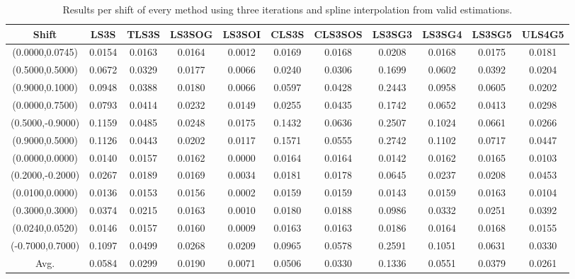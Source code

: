 \begin{table}[ht!]
\centering
\begin{tabular}{c|c|c|c|c|c|c|c|c|c|c}
Shift & \scriptsize{LS3S} & \scriptsize{TLS3S} & \scriptsize{LS3SOG} & \scriptsize{LS3SOI} & \scriptsize{CLS3S} & \scriptsize{CLS3SOS} & \scriptsize{LS3SG3} & \scriptsize{LS3SG4} & \scriptsize{LS3SG5} & \scriptsize{ULS4G5}\\ \hline 
(0.0000,0.0745) & 0.0154 & 0.0163 & 0.0164 & 0.0012 & 0.0169 & 0.0168 & 0.0208 & 0.0168 & 0.0175 & 0.0181 \\ \hline
(0.5000,0.5000) & 0.0672 & 0.0329 & 0.0177 & 0.0066 & 0.0240 & 0.0306 & 0.1699 & 0.0602 & 0.0392 & 0.0204 \\ \hline
(0.9000,0.1000) & 0.0948 & 0.0388 & 0.0180 & 0.0066 & 0.0597 & 0.0428 & 0.2443 & 0.0958 & 0.0605 & 0.0202 \\ \hline
(0.0000,0.7500) & 0.0793 & 0.0414 & 0.0232 & 0.0149 & 0.0255 & 0.0435 & 0.1742 & 0.0652 & 0.0413 & 0.0298 \\ \hline
(0.5000,-0.9000) & 0.1159 & 0.0485 & 0.0248 & 0.0175 & 0.1432 & 0.0636 & 0.2507 & 0.1024 & 0.0661 & 0.0266 \\ \hline
(0.9000,0.5000) & 0.1126 & 0.0443 & 0.0202 & 0.0117 & 0.1571 & 0.0555 & 0.2742 & 0.1102 & 0.0717 & 0.0447 \\ \hline
(0.0000,0.0000) & 0.0140 & 0.0157 & 0.0162 & 0.0000 & 0.0164 & 0.0164 & 0.0142 & 0.0162 & 0.0165 & 0.0103 \\ \hline
(0.2000,-0.2000) & 0.0267 & 0.0189 & 0.0169 & 0.0034 & 0.0181 & 0.0178 & 0.0645 & 0.0237 & 0.0208 & 0.0453 \\ \hline
(0.0100,0.0000) & 0.0136 & 0.0153 & 0.0156 & 0.0002 & 0.0159 & 0.0159 & 0.0143 & 0.0159 & 0.0163 & 0.0104 \\ \hline
(0.3000,0.3000) & 0.0374 & 0.0215 & 0.0163 & 0.0010 & 0.0180 & 0.0188 & 0.0986 & 0.0332 & 0.0251 & 0.0392 \\ \hline
(0.0240,0.0520) & 0.0146 & 0.0157 & 0.0160 & 0.0009 & 0.0163 & 0.0163 & 0.0186 & 0.0164 & 0.0168 & 0.0155 \\ \hline
(-0.7000,0.7000) & 0.1097 & 0.0499 & 0.0268 & 0.0209 & 0.0965 & 0.0578 & 0.2591 & 0.1051 & 0.0631 & 0.0330 \\ \hline
Avg.  & 0.0584 & 0.0299 & 0.0190 & 0.0071 & 0.0506 & 0.0330 & 0.1336 & 0.0551 & 0.0379 & 0.0261 \\ \hline
\end{tabular}
\caption{Results per shift of every method using three iterations and spline interpolation from valid estimations.}
\label{tab:3itSperShiftValid}
\end{table}


